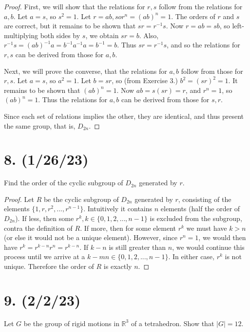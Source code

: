 \documentclass{article}
\begin{document}
\begin{proof}
    First, we will show that the relations for $r, s$ follow from the relations for $a, b$. Let $a = s$, so $s^2 = 1$. Let $r = ab, so r^n = (ab)^n = 1$. The orders of $r$ and $s$ are correct, but it remains to be shown that $sr = r^{-1}s$. Now $r = ab = sb$, so left-multiplying both sides by $s$, we obtain $sr = b$. Also, $r^{-1}s = (ab)^{-1} a = b^{-1} a^{-1} a = b^{-1} = b$. Thus $sr = r^{-1}s$, and so the relations for $r, s$ can be derived from those for $a, b$.
    
    Next, we will prove the converse, that the relations for $a, b$ follow from those for $r, s$. Let $a = s$, so $a^2 = 1$. Let $b = sr$, so (from Exercise 3.) $b^2 = (sr)^2 = 1$. It remains to be shown that $(ab)^n = 1$. Now $ab = s(sr) = r$, and $r^n = 1$, so $(ab)^n = 1$. Thus the relations for $a, b$ can be derived from those for $s, r$.

    Since each set of relations implies the other, they are identical, and thus present the same group, that is, $D_{2n}$.
\end{proof}

\section*{8. (1/26/23)}

Find the order of the cyclic subgroup of $D_{2n}$ generated by $r$.

\begin{proof}
    Let $R$ be the cyclic subgroup of $D_{2n}$ generated by $r$, consisting of the elements $\{1, r, r^2, ..., r^{n - 1}\}$. Intuitively it contains $n$ elements (half the order of $D_{2n}$). If less, then some $r^k, k \in \{0, 1, 2, ..., n - 1\}$ is excluded from the subgroup, contra the definition of $R$. If more, then for some element $r^k$ we must have $k > n$ (or else it would not be a unique element). However, since $r^n = 1$, we would then have $r^k = r^{k - n} r^n = r^{k - n}$. If $k - n$ is still greater than $n$, we would continue this process until we arrive at a $k - mn \in \{0, 1, 2, ..., n - 1\}$. In either case, $r^k$ is not unique. Therefore the order of $R$ is exactly $n$.
\end{proof}

\section*{9. (2/2/23)}

Let $G$ be the group of rigid motions in $\mathbb{R}^3$ of a tetrahedron. Show that $|G| = 12$.
\end{document}
